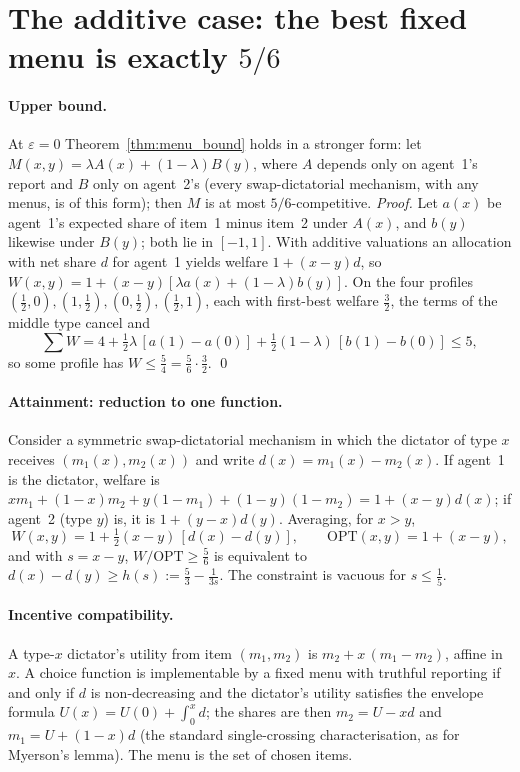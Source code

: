 \section{The additive case: the best fixed menu is exactly $5/6$}
\label{app:sd}

\paragraph{Upper bound.} At $\varepsilon=0$ Theorem~\ref{thm:menu_bound} holds in a stronger form: let
$M(x,y)=\lambda A(x)+(1-\lambda)B(y)$, where $A$ depends only on agent~1's report and $B$ only on
agent~2's (every swap-dictatorial mechanism, with any menus, is of this form); then $M$ is at most
$5/6$-competitive. \emph{Proof.} Let $a(x)$ be agent~1's expected share of item~1 minus item~2 under $A(x)$, and $b(y)$ likewise
under $B(y)$; both lie in $[-1,1]$. With additive valuations an allocation with net share $d$
for agent~1 yields welfare $1+(x-y)d$, so $W(x,y)=1+(x-y)[\lambda a(x)+(1-\lambda)b(y)]$. On the four
profiles $(\tfrac12,0),(1,\tfrac12),(0,\tfrac12),(\tfrac12,1)$, each with first-best welfare $\tfrac32$,
the terms of the middle type cancel and
\[
\textstyle\sum W=4+\tfrac12\lambda\,[a(1)-a(0)]+\tfrac12(1-\lambda)\,[b(1)-b(0)]\le5 ,
\]
so some profile has $W\le\tfrac54=\tfrac56\cdot\tfrac32$. \qed

\paragraph{Attainment: reduction to one function.} Consider a symmetric swap-dictatorial mechanism in which
the dictator of type $x$ receives $(m_1(x),m_2(x))$ and write $d(x)=m_1(x)-m_2(x)$. If agent~1 is
the dictator, welfare is $xm_1+(1-x)m_2+y(1-m_1)+(1-y)(1-m_2)=1+(x-y)d(x)$; if agent~2 (type $y$) is,
it is $1+(y-x)d(y)$. Averaging, for $x>y$,
\[
W(x,y)=1+\tfrac12(x-y)\,[d(x)-d(y)],\qquad \mathrm{OPT}(x,y)=1+(x-y),
\]
and with $s=x-y$, $W/\mathrm{OPT}\ge\tfrac56$ is equivalent to $d(x)-d(y)\ge h(s):=\tfrac53-\tfrac1{3s}$.
The constraint is vacuous for $s\le\tfrac15$.

\paragraph{Incentive compatibility.} A type-$x$ dictator's utility from item $(m_1,m_2)$ is
$m_2+x\,(m_1-m_2)$, affine in $x$. A choice function is implementable by a fixed menu with
truthful reporting if and only if $d$ is non-decreasing and the dictator's utility satisfies the
envelope formula $U(x)=U(0)+\int_0^x d$; the shares are then $m_2=U-xd$ and $m_1=U+(1-x)d$
(the standard single-crossing characterisation, as for Myerson's lemma). The menu is the set of
chosen items.

